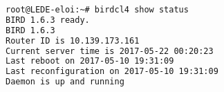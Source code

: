 \begin{lstlisting}[language=bash,caption={Bird status query.}]
root@LEDE-eloi:~# birdcl4 show status
BIRD 1.6.3 ready.
BIRD 1.6.3
Router ID is 10.139.173.161
Current server time is 2017-05-22 00:20:23
Last reboot on 2017-05-10 19:31:09
Last reconfiguration on 2017-05-10 19:31:09
Daemon is up and running
\end{lstlisting}